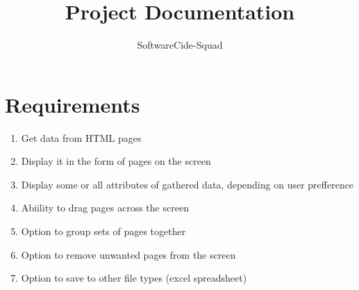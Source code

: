 \documentclass[12pt]{article}
\begin{document}
\title{Project Documentation}
\author{SoftwareCide-Squad}
\maketitle

\section{Requirements}
\begin{enumerate}
\item Get data from HTML pages
\item Display it in the form of pages on the screen
\item Display some or all attributes of gathered data, depending on user prefference
\item Abiility to drag pages across the screen
\item Option to group sets of pages together
\item Option to remove unwanted pages from the screen
\item Option to save to other file types (excel spreadsheet)
\end{enumerate}
\end{document}
